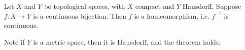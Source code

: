 \documentclass[12pt]{article}
\begin{document}
Let $X$ and $Y$ be topological spaces, with $X$ compact and $Y$ Hausdorff. Suppose $f:X \rightarrow Y$ is a continuous bijection. Then $f$ is a homeomorphism, i.e. $f^{-1}$ is continuous.

Note if $Y$ is a metric space, then it is Hausdorff, and the theorem holds.
\end{document}
